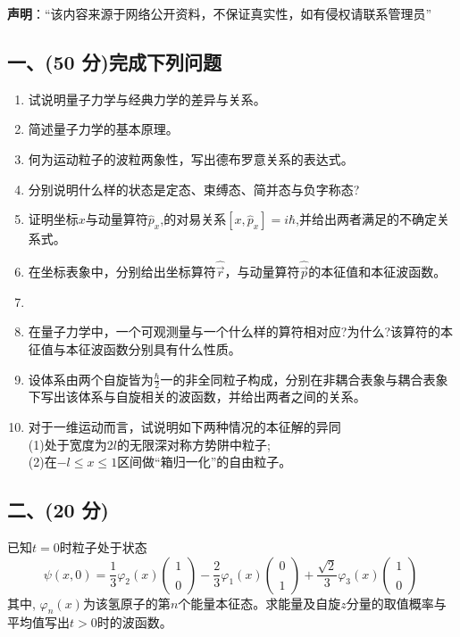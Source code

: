 
\textbf{声明}：“该内容来源于网络公开资料，不保证真实性，如有侵权请联系管理员”

\subsection{一、(50 分)完成下列问题}
\begin{enumerate}
\item 试说明量子力学与经典力学的差异与关系。
\item 简述量子力学的基本原理。
\item 何为运动粒子的波粒两象性，写出德布罗意关系的表达式。
\item 分别说明什么样的状态是定态、束缚态、简并态与负字称态?
\item 证明坐标$x$与动量算符$\hat{p}_x$,的对易关系$[x,\hat{p}_x]=i\hbar$,并给出两者满足的不确定关系式。
\item 在坐标表象中，分别给出坐标算符$\hat{\vec{r}}$，与动量算符$\hat{\vec{p}}$的本征值和本征波函数。
\item 
\item 在量子力学中，一个可观测量与一个什么样的算符相对应?为什么?该算符的本征值与本征波函数分别具有什么性质。
\item 设体系由两个自旋皆为$\frac{\hbar}{2}$一的非全同粒子构成，分别在非耦合表象与耦合表象下写出该体系与自旋相关的波函数，并给出两者之间的关系。
\item 对于一维运动而言，试说明如下两种情况的本征解的异同\\
(1)处于宽度为$2l$的无限深对称方势阱中粒子;\\
(2)在$-l\leq x \leq1$区间做“箱归一化”的自由粒子。
\end{enumerate}
\subsection{二、(20 分)}
已知$t=0$时粒子处于状态
$$\psi(x,0) = \frac{1}{3} \varphi_2(x) 
\begin{pmatrix}
1 \\\\
0
\end{pmatrix}
-\frac{2}{3} \varphi_1(x) 
\begin{pmatrix}
0 \\\\
1
\end{pmatrix}
+ \frac{\sqrt{2}}{3} \varphi_3(x)
\begin{pmatrix}
1 \\\\
0
\end{pmatrix}~$$
其中, $\varphi_n(x)$为该氢原子的第$n$个能量本征态。求能量及自旋$z$分量的取值概率与平均值写出$t>0$时的波函数。
